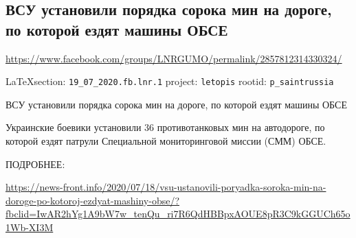  
 
\subsection{ВСУ установили порядка сорока мин на дороге, по которой ездят машины ОБСЕ}
\url{https://www.facebook.com/groups/LNRGUMO/permalink/2857812314330324/}

  
\vspace{0.5cm}
{\small\LaTeX section: \verb|19_07_2020.fb.lnr.1| project: \verb|letopis| rootid: \verb|p_saintrussia|}
\vspace{0.5cm}

ВСУ установили порядка сорока мин на дороге, по которой ездят машины ОБСЕ

Украинские боевики установили 36 противотанковых мин на автодороге, по которой
ездят патрули Специальной мониторинговой миссии (СММ) ОБСЕ.

ПОДРОБНЕЕ:
  
\url{https://news-front.info/2020/07/18/vsu-ustanovili-poryadka-soroka-min-na-doroge-po-kotoroj-ezdyat-mashiny-obse/?fbclid=IwAR2hYg1A9bW7w_tenQu_ri7R6QdHBBpxAOUE8pR3C9kGGUCh65o1Wb-XI3M}
